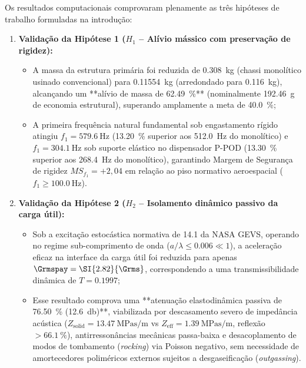 Os resultados computacionais comprovaram plenamente as três hipóteses de trabalho formuladas na introdução:

\begin{enumerate}
  \item \textbf{Validação da Hipótese 1 ($H_1$ -- Alívio mássico com preservação de rigidez):}
  \begin{itemize}
    \item A massa da estrutura primária foi reduzida de \SI{0.308}{\kilo\gram} (chassi monolítico usinado convencional) para \SI{0.11554}{\kilo\gram} (arredondado para \SI{0.116}{\kilo\gram}), alcançando um **alívio de massa de \SI{62.49}{\percent}** (nominalmente \SI{192.46}{\gram} de economia estrutural), superando amplamente a meta de \SI{40.0}{\percent};
    \item A primeira frequência natural fundamental sob engastamento rígido atingiu $f_1 = \SI{579.6}{\hertz}$ (\SI{+13.20}{\percent} superior aos \SI{512.0}{\hertz} do monolítico) e $f_1 = \SI{304.1}{\hertz}$ sob suporte elástico no dispensador P-POD (\SI{+13.30}{\percent} superior aos \SI{268.4}{\hertz} do monolítico), garantindo Margem de Segurança de rigidez $MS_{f_1} = +2{,}04$ em relação ao piso normativo aeroespacial ($f_1 \ge \SI{100.0}{\hertz}$).
  \end{itemize}

  \item \textbf{Validação da Hipótese 2 ($H_2$ -- Isolamento dinâmico passivo da carga útil):}
  \begin{itemize}
    \item Sob a excitação estocástica normativa de \SI{14.1}{\Grms} da NASA GEVS, operando no regime sub-comprimento de onda ($a/\lambda \le \num{0.006} \ll 1$), a aceleração eficaz na interface da carga útil foi reduzida para apenas $\Grmspay = \SI{2.82}{\Grms}$, correspondendo a uma transmissibilidade dinâmica de $T = \num{0.1997}$;
    \item Esse resultado comprova uma **atenuação elastodinâmica passiva de \SI{76.50}{\percent} (\SI{12.6}{\decibel})**, viabilizada por descasamento severo de impedância acústica ($Z_{\text{solid}} = \SI{13.47}{\mega\pascal\second\per\metre}$ vs $Z_{\text{eff}} = \SI{1.39}{\mega\pascal\second\per\metre}$, reflexão $> \SI{66.1}{\percent}$), antirressonâncias mecânicas passa-baixa e desacoplamento de modos de tombamento (\textit{rocking}) via Poisson negativo, sem necessidade de amortecedores poliméricos externos sujeitos a desgaseificação (\textit{outgassing}).
  \end{itemize}


\end{enumerate}
